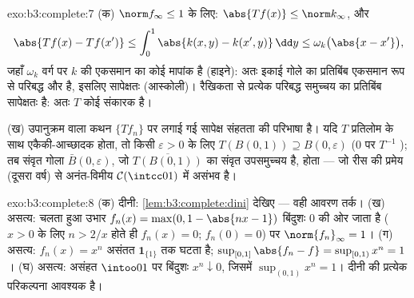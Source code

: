 \begin{solution}{exo:b3:complete:7}
(क) $\norm f_\infty \leq 1$ के लिए: $\abs{Tf(x)} \leq
\norm k_\infty$, और
\[
\abs{Tf(x) - Tf(x')} \leq \int_0^1\abs{k(x,y) -
k(x',y)}\,\dd y \leq \omega_k\bigl(\abs{x - x'}\bigr),
\]
जहाँ $\omega_k$  वर्ग पर $k$ की एकसमान  का कोई मापांक है
(हाइने): अतः इकाई गोले का प्रतिबिंब एकसमान रूप से परिबद्ध और 
है, इसलिए सापेक्षतः  (आस्कोली)। रैखिकता से प्रत्येक परिबद्ध
समुच्चय का प्रतिबिंब सापेक्षतः  है: अतः $T$ कोई  संकारक
है।

(ख) उपानुक्रम वाला कथन $\{Tf_n\}$ पर लगाई गई सापेक्ष संहतता की परिभाषा
है। यदि $T$  प्रतिलोम के साथ एकैकी-आच्छादक होता, तो किसी $\varepsilon > 0$
के लिए $T(B(0,1)) \supseteq B(0,
\varepsilon)$ ($0$ पर $T^{-1}$ ); तब संवृत गोला $\bar B(0,\varepsilon)$, जो 
$\overline{T(B(0,1))}$ का संवृत उपसमुच्चय है,  होता --- जो रीस की प्रमेय (दूसरा
वर्ष) से अनंत-विमीय $\mathcal
C(\intcc01)$ में असंभव है।
\end{solution}

\begin{solution}{exo:b3:complete:8}
(क) दीनी: \cref{lem:b3:complete:dini} देखिए --- वही आवरण तर्क। (ख) असत्य: चलता हुआ उभार
$f_n(x) = \max(0, 1 -
\abs{nx - 1})$ बिंदुशः $0$ की ओर जाता है ($x > 0$ के लिए $n > 2/x$ होते ही $f_n(x) =
0$;
$f_n(0) = 0$) पर $\norm{f_n}_\infty = 1$। (ग) असत्य: $f_n(x) = x^n$ असंतत $\mathbf 1_{\{1\}}$ तक घटता है; $\sup_{[0,1]}\abs{f_n - f} = \sup_{[0,1)}
x^n = 1$।
(घ) असत्य: असंहत $\intoo01$ पर बिंदुशः $x^n \downarrow 0$, जिसमें $\sup_{(0,1)}x^n = 1$। दीनी की
प्रत्येक परिकल्पना आवश्यक है।
\end{solution}

